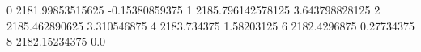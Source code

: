 0 2181.99853515625 -0.15380859375
1 2185.796142578125 3.643798828125
2 2185.462890625 3.310546875
4 2183.734375 1.58203125
6 2182.4296875 0.27734375
8 2182.15234375 0.0
